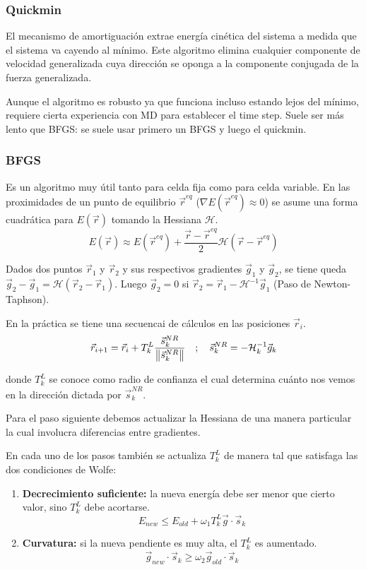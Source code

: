 \subsubsection{Quickmin}

  El mecanismo de amortiguación extrae energía cinética del sistema a medida que el sistema va cayendo al mínimo. Este algoritmo elimina cualquier componente de velocidad generalizada cuya dirección se oponga a la componente conjugada de la fuerza generalizada.

  Aunque el algoritmo es robusto ya que funciona incluso estando lejos del mínimo, requiere cierta experiencia con MD para establecer el time step. Suele ser más lento que BFGS: se suele usar primero un BFGS y luego el quickmin.

\subsubsection{BFGS}

  Es un algoritmo muy útil tanto para celda fija como para celda variable. En las proximidades de un punto de equilibrio $\vec{r}^{eq}$ ($\nabla E (\vec{r}^{eq}) \approx 0$) se asume una forma cuadrática para $E(\vec{r})$ tomando la Hessiana $\mathcal{H}$.
    $$E(\vec{r}) \approx E(\vec{r}^{eq}) + \frac{\vec{r} - \vec{r}^{eq}}{2} \mathcal{H} (\vec{r} - \vec{r}^{eq})$$

  Dados dos puntos $\vec{r}_1$ y $\vec{r}_2$ y sus respectivos gradientes $\vec{g}_1$ y $\vec{g}_2$, se tiene queda $\vec{g}_2 - \vec{g}_1 = \mathcal{H} (\vec{r}_2 - \vec{r}_1)$. Luego $\vec{g}_2=0$ si $\vec{r}_2 = \vec{r}_1 - \mathcal{H}^{-1} \vec{g}_1$ (Paso de Newton-Taphson).

  En la práctica se tiene una secuencai de cálculos en las posiciones $\vec{r}_i$.
    $$\vec{r}_{i+1} = \vec{r}_i + T_k^L \frac{\vec{s}_k^{NR}}{\norm{\vec{s}_k^{NR}}} \quad ; \quad \vec{s}_k^{NR} = - \mathcal{H}_k^{-1} \vec{g}_k$$

  donde $T_k^L$ se conoce como radio de confianza el cual determina cuánto nos vemos en la dirección dictada por $\vec{s}_k^{NR}$.

  Para el paso siguiente debemos actualizar la Hessiana de una manera particular la cual involucra diferencias entre gradientes.

  En cada uno de los pasos también se actualiza $T_k^L$ de manera tal que satisfaga las dos condiciones de Wolfe:
    \begin{enumerate}
      \item \textbf{Decrecimiento suficiente:} la nueva energía debe ser menor que cierto valor, sino $T_k^L$ debe acortarse.
        $$E_{new} \leq E_{old} + \omega_1 T_k^L \vec{g}\cdot \vec{s}_k$$
      \item \textbf{Curvatura:} si la nueva pendiente es muy alta, el $T_k^L$ es aumentado.
        $$\vec{g}_{new} \cdot \vec{s}_k \geq \omega_2 \vec{g}_{old} \cdot \vec{s}_k$$
    \end{enumerate}

